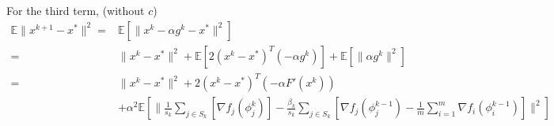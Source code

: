 \documentclass[11pt]{article}
\begin{document}
For the third term, (without $c$) 
\begin{align*}
	\mathbb{E}  \|x^{k+1} - x^* \|^2  =& \mathbb{E} \left[  \|x^k - \alpha g^k - x^* \|^2 \right] \\
	=&  \|x^k - x^* \|^2  +  \mathbb{E} \left[ 2 (x^k - x^* )^T (- \alpha g^k) \right]  +  \mathbb{E} \left[  \|\alpha g^k \|^2 \right] \\
	=&  \|x^k - x^* \|^2  + 2 (x^k - x^* )^T (- \alpha  F'(x^k)) \\
	&+ \alpha^2 \mathbb{E} \left[  \|\frac{1}{s_k} \sum_{j \in S_k} \left[  \nabla f_j(\phi_j^{k}) \right]- \frac{ \beta_k }{s_k} \sum_{j \in S_k} \left[  \nabla f_j(\phi^{k-1}_j) - \frac{1}{m} \sum_{i = 1}^{m }  \nabla f_i (\phi_i^{k-1}) \right]  \|^2 \right] \\
\end{align*}
\end{document}
